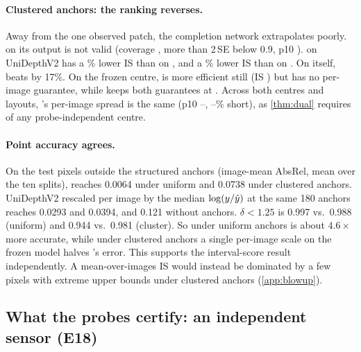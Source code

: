 \paragraph{Clustered anchors: the ranking reverses.}
Away from the one observed patch, the completion network extrapolates poorly.
\mSplitCP on its output is not valid (coverage , more than 2\,SE below 0.9, p10 ).
\mDual on UniDepthV2 has a \NumClusterGainDual\% lower IS than \mDual on \omnidc, and a \NumClusterGainCP\% lower IS than \mSplitCP on \omnidc.
On \omnidc itself, \mDual beats \mSplitCP by 17\%.
On the frozen centre, \mDistSplit is more efficient still (IS ) but has no per-image guarantee, while \mDualBoth keeps both guarantees at .
Across both centres and layouts, \mDual's per-image spread is the same (p10 \NumENineteenPTenLo--\NumENineteenPTenHi, \NumENineteenShortLo--\NumENineteenShortHi\% short), as \cref{thm:dual} requires of any probe-independent centre.

\paragraph{Point accuracy agrees.}
On the test pixels outside the structured anchors (image-mean AbsRel, mean over the ten splits), \omnidc reaches 0.0064 under uniform and 0.0738 under clustered anchors.
UniDepthV2 rescaled per image by the median $\log(y/\hat{y})$ at the same 180 anchors reaches 0.0293 and 0.0394, and 0.121 without anchors.
$\delta<1.25$ is 0.997 vs.\ 0.988 (uniform) and 0.944 vs.\ 0.981 (cluster).
So under uniform anchors \omnidc is about $4.6\times$ more accurate, while under clustered anchors a single per-image scale on the frozen model halves \omnidc's error.
This supports the interval-score result independently.
A mean-over-images IS would instead be dominated by a few \omnidc pixels with extreme upper bounds under clustered anchors (\cref{app:blowup}).

\subsection{What the probes certify: an independent sensor (E18)}
\label{sec:res:sensor}

